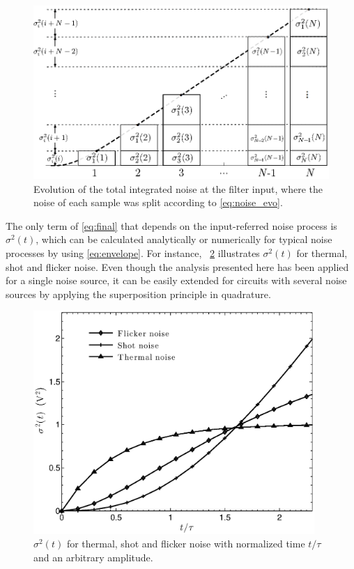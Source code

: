 \begin{figure}[!t]
	\centering
	\includegraphics[width=5in]{./Figures/envelope-example.eps}
	\caption{Evolution of the total integrated noise at the filter input, where the noise of each sample was split according to \eqref{eq:noise_evo}.}\label{fig:envelope-example}
\end{figure}

The only term of \eqref{eq:final} that depends on the input-referred noise process is $\sigma^2(t)$, which can be calculated analytically or numerically for typical noise processes by using \eqref{eq:envelope}. For instance, \figurename~\ref{fig:envelopes} illustrates $\sigma^2(t)$ for thermal, shot and flicker noise. Even though the analysis presented here has been applied for a single noise source, it can be easily extended for circuits with several noise sources by applying the superposition principle in quadrature. 

\begin{figure}[!t]
	\centering
	\includegraphics[width=4.2in]{./Figures/envelopes.eps}
	\caption{$\sigma^2(t)$ for thermal, shot and flicker noise with normalized time $t/\tau$ and an arbitrary amplitude.}\label{fig:envelopes}
\end{figure}

